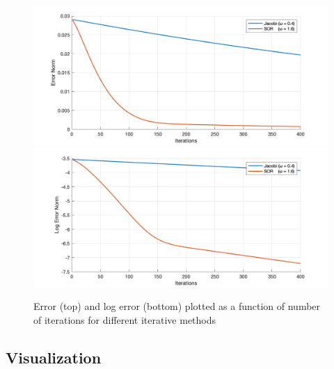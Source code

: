 \documentclass[11pt,titlepage]{article}
\begin{document}
\begin{figure}[!htbp]
    \begin{center}
        \includegraphics[width=\textwidth]{archbridge_tiny_errornorm.png}
        \includegraphics[width=\textwidth]{archbridge_tiny_logerrornorm.png}
        \caption{\label{fig:3} Error (top) and log error (bottom) plotted as a function of number of iterations for different iterative methods}
    \end{center}
\end{figure}

\subsection{Visualization}





\newpage
\printbibliography
\end{document}
